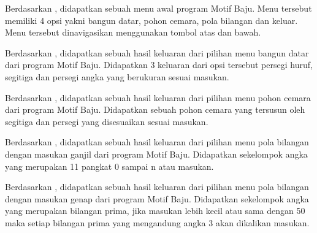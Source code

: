\documentclass[../main.tex]{subfiles}
\begin{document}
    \begin{indentpar}
        \hspace{\parindent}Berdasarkan , didapatkan sebuah menu awal program Motif Baju. Menu tersebut memiliki 4 opsi yakni bangun datar, pohon cemara, pola bilangan dan keluar. Menu tersebut dinavigasikan menggunakan tombol atas dan bawah.
    \end{indentpar}

    \begin{indentpar}
        \hspace{\parindent}Berdasarkan , didapatkan sebuah hasil keluaran dari pilihan menu bangun datar dari program Motif Baju. Didapatkan 3 keluaran dari opsi tersebut persegi huruf, segitiga dan persegi angka yang berukuran sesuai masukan.
    \end{indentpar}
    \blanktop
    \begin{indentpar}
        \hspace{\parindent}Berdasarkan , didapatkan sebuah hasil keluaran dari pilihan menu pohon cemara dari program Motif Baju. Didapatkan sebuah pohon cemara yang tersusun oleh segitiga dan persegi yang disesuaikan sesuai masukan.
    \end{indentpar}

    \begin{indentpar}
        \hspace{\parindent}Berdasarkan , didapatkan sebuah hasil keluaran dari pilihan menu pola bilangan dengan masukan ganjil dari program Motif Baju. Didapatkan sekelompok angka yang merupakan 11 pangkat 0 sampai n atau masukan.
    \end{indentpar}

    \begin{indentpar}
        \hspace{\parindent}Berdasarkan , didapatkan sebuah hasil keluaran dari pilihan menu pola bilangan dengan masukan genap dari program Motif Baju. Didapatkan sekelompok angka yang merupakan bilangan prima, jika masukan lebih kecil atau sama dengan 50 maka setiap bilangan prima yang mengandung angka 3 akan dikalikan masukan.
    \end{indentpar}
\end{document}
